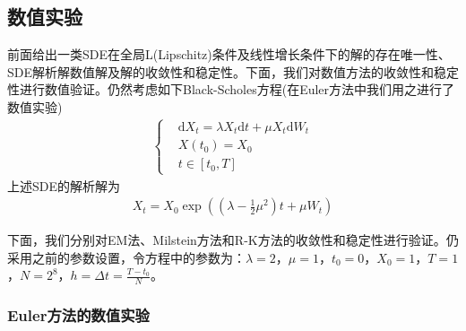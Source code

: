     \subsection{数值实验}
        \label{subsec:数值实验}
        \par
        前面给出一类SDE在全局L(Lipschitz)条件及线性增长条件下的解的存在唯一性、SDE解析解数值解及解的收敛性和稳定性。下面，我们对数值方法的收敛性和稳定性进行数值验证。仍然考虑如下Black-Scholes方程(在Euler方法中我们用之进行了数值实验)
        \begin{align*}
            \left\{
            \begin{aligned}
            &\mathrm{d}X_t = \lambda X_t \mathrm{d}t + \mu X_t \mathrm{d}W_t\\
            &X(t_0) = X_0\\
            &t\in [t_0,T]
            \end{aligned}
            \right.
        \end{align*}
        上述SDE的解析解为
        \begin{align*}
            X_t = X_0\exp\left( \left( \lambda -\frac 12 \mu^2\right)t + \mu W_t \right)
        \end{align*}
        \par
        下面，我们分别对EM法、Milstein方法和R-K方法的收敛性和稳定性进行验证。仍采用之前的参数设置，令方程中的参数为：$\lambda = 2$，$\mu = 1$，$t_0 = 0$，$X_0 = 1$，$T = 1$，$N = 2^8$，$h = \Delta t = \frac{T - t_0}{N}$。
        \subsubsection{Euler方法的数值实验}
            \label{subsubsec:Euler方法的数值实验}

